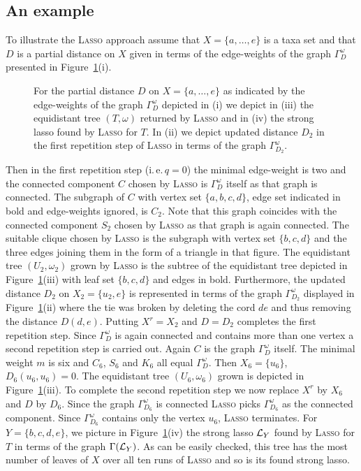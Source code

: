 \subsection{An example}
\label{sec:example}

To illustrate the \textsc{Lasso} approach assume that $X=\{a,\ldots, e\}$ is a
taxa set and that $D$ is a partial distance on $X$ given in terms of the
edge-weights of the graph $\Gamma^{\omega}_D$ presented in
Figure~\ref{fig:pink-const}(i).

\begin{figure}
  \centering
  
  \caption{For the partial distance $D$ on $X=\{a,\ldots, e\}$ as indicated by
    the edge-weights of the graph $\Gamma^{\omega}_D$ depicted in (i) we
    depict in (iii) the equidistant tree $(T,\omega)$ returned by \textsc{Lasso}
    and in (iv) the strong lasso found by \textsc{Lasso} for $T$. In (ii) we
    depict updated distance $D_2$ in the first repetition step of \textsc{Lasso}
    in terms of the graph $\Gamma^{\omega}_{D_2}$.}
  \label{fig:pink-const}
\end{figure}
% 
Then in the first repetition step (i.\,e.\,$q=0$) the minimal edge-weight is
two and the connected component $C$ chosen by \textsc{Lasso} is
$\Gamma^{\omega}_D$ itself as that graph is connected. The subgraph of $C$
with vertex set $\{a,b,c,d\}$, edge set indicated in bold and edge-weights
ignored, is $C_2$. Note that this graph coincides with the connected component
$S_2$ chosen by \textsc{Lasso} as that graph is again connected. The suitable
clique chosen by \textsc{Lasso} is the subgraph with vertex set $\{b,c,d\}$ and
the three edges joining them in the form of a triangle in that figure.  The
equidistant tree $(U_2,\omega_2)$ grown by \textsc{Lasso} is the subtree of the
equidistant tree depicted in Figure~\ref{fig:pink-const}(iii) with leaf set
$\{b,c,d\}$ and edges in bold. Furthermore, the updated distance $D_2$ on
$X_2=\{u_2,e\}$ is represented in terms of the graph $\Gamma^{\omega}_{D_2}$
displayed in Figure~\ref{fig:pink-const}(ii) where the tie was broken by
deleting the cord $de$ and thus removing the distance $D(d,e)$. Putting
$X^r=X_2$ and $D=D_2$ completes the first repetition step. Since
$\Gamma^{\omega}_D$ is again connected and contains more than one vertex a
second repetition step is carried out. Again $C$ is the graph
$\Gamma^{\omega}_D$ itself.  The minimal weight $m$ is six and $C_6$, $S_6$
and $K_6$ all equal $\Gamma^{\omega}_D$. Then $X_6=\{u_6\}$,
$D_6(u_6,u_6)=0$. The equidistant tree $(U_6,\omega_6)$ grown is depicted in
Figure~\ref{fig:pink-const}(iii). To complete the second repetition step we
now replace $X^r$ by $X_6$ and $D$ by $D_6$. Since the graph
$\Gamma^{\omega}_{D_6}$ is connected \textsc{Lasso} picks $\Gamma^{\omega}_{D_6}$
as the connected component. Since $\Gamma^{\omega}_{D_6}$ contains only the
vertex $u_6$, \textsc{Lasso} terminates. For $Y=\{b,c,d,e\}$, we picture in
Figure~\ref{fig:pink-const}(iv) the strong lasso ${\mathcal L}_Y$ found by \textsc{Lasso}
for $T$ in terms of the graph $\Gamma({\mathcal L}_Y)$. As can be easily checked, this
tree has the most number of leaves of $X$ over all ten runs of \textsc{Lasso} and
so is its found strong lasso.

